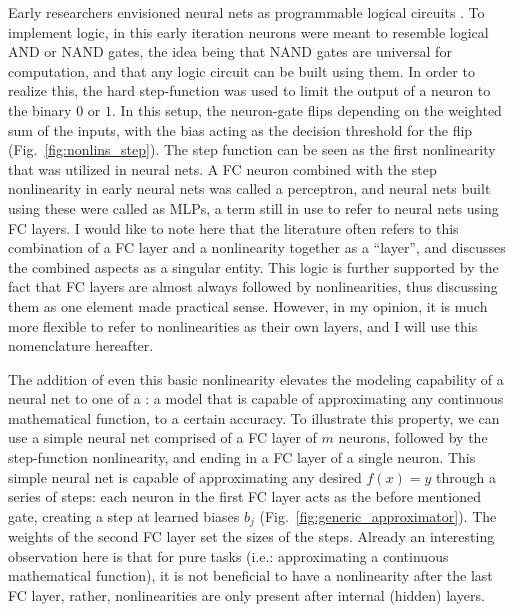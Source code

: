 			Early researchers envisioned neural nets as programmable logical circuits \cite{neocognitron}.
			To implement logic, in this early iteration neurons were meant to resemble logical AND or NAND gates, the idea being that NAND gates are universal for computation, and that any logic circuit can be built using them.
			In order to realize this, the hard step-function was used to limit the output of a neuron to the binary $0$ or $1$.	
			In this setup, the neuron-gate flips depending on the weighted sum of the inputs, with the bias acting as the decision threshold for the flip (Fig.~\ref{fig:nonlins_step}).
			The step function can be seen as the first nonlinearity that was utilized in neural nets.
			A \ac{FC} neuron combined with the step nonlinearity in early neural nets was called a perceptron, and neural nets built using these were called as \acp{MLP}, a term still in use to refer to neural nets using \ac{FC} layers.
			I would like to note here that the literature often refers to this combination of a \ac{FC} layer and a nonlinearity together as a ``layer'', and discusses the combined aspects as a singular entity.
			This logic is further supported by the fact that \ac{FC} layers are almost always followed by nonlinearities, thus discussing them as one element made practical sense.
			However, in my opinion, it is much more flexible to refer to nonlinearities as their own layers, and I will use this nomenclature hereafter.
			
			The addition of even this basic nonlinearity elevates the modeling capability of a neural net to one of a : a model that is capable of approximating any continuous mathematical function, to a certain accuracy.
			To illustrate this property, we can use a simple neural net comprised of a \ac{FC} layer of $m$ neurons, followed by the step-function nonlinearity, and ending in a \ac{FC} layer of a single neuron.
			This simple neural net is capable of approximating any desired $f(x) = y$ through a series of steps: each neuron in the first \ac{FC} layer acts as the before mentioned gate, creating a step at learned biases $b_j$ (Fig.~\ref{fig:generic_approximator}).
			The weights of the second \ac{FC} layer set the sizes of the steps.
			Already an interesting observation here is that for pure  tasks (i.e.: approximating a continuous mathematical function), it is not beneficial to have a nonlinearity after the last \ac{FC} layer, rather, nonlinearities are only present after internal (hidden) layers.
			
